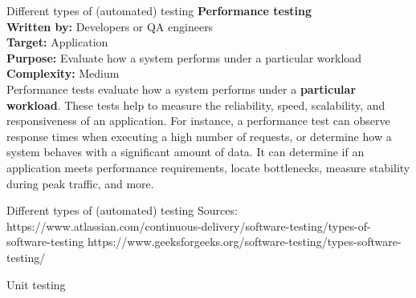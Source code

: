 \documentclass[
  ignorenonframetext,
  american,
  t,
  aspectratio=169]{beamer}
\begin{document}
\begin{frame}{Different types of (automated) testing}
\protect{}\label{different-types-of-automated-testing-8}
\textbf{Performance testing}\\
\textbf{Written by:} Developers or QA engineers\\
\textbf{Target:} Application\\
\textbf{Purpose:} Evaluate how a system performs under a particular
workload\\
\textbf{Complexity:} Medium\\
Performance tests evaluate how a system performs under a
\textbf{particular workload}. These tests help to measure the
reliability, speed, scalability, and responsiveness of an application.
For instance, a performance test can observe response times when
executing a high number of requests, or determine how a system behaves
with a significant amount of data. It can determine if an application
meets performance requirements, locate bottlenecks, measure stability
during peak traffic, and more.
\end{frame}

\begin{frame}{Different types of (automated) testing}
\protect{}\label{different-types-of-automated-testing-9}
Sources:\\
https://www.atlassian.com/continuous-delivery/software-testing/types-of-software-testing
https://www.geeksforgeeks.org/software-testing/types-software-testing/
\end{frame}

\begin{frame}{Unit testing}
\protect{}\label{unit-testing}
\end{frame}
\end{document}
